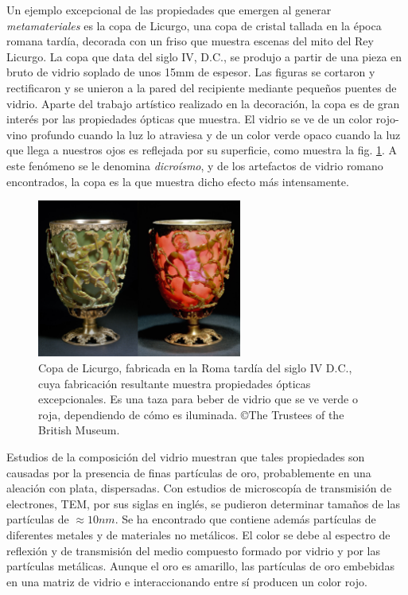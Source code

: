 \documentclass[12pt]{article}
\begin{document}
Un ejemplo excepcional de las propiedades que emergen al generar
\textit{metamateriales} es la copa de Licurgo, una copa de cristal
tallada en la época romana tardía, decorada con un friso que muestra
escenas del mito del Rey Licurgo. La copa que data del siglo IV, D.C.,
se produjo a partir de una pieza en bruto de vidrio soplado de unos
15mm de espesor. Las figuras se cortaron y rectificaron y se unieron a
la pared del recipiente mediante pequeños puentes de vidrio. Aparte
del trabajo artístico realizado en la decoración, la copa es de gran
interés por las propiedades ópticas que muestra. El vidrio se ve de
un color rojo-vino profundo cuando la luz lo atraviesa y de un color verde opaco
cuando la luz que llega a nuestros ojos es reflejada por su
superficie, como muestra la fig. \ref{Lycurgus}. A este fenómeno se le
denomina \textit{dicroísmo}, y de los artefactos de vidrio romano
encontrados, la copa es la que muestra dicho efecto más
intensamente. \cite{LycurgusInvestigation}
\begin{figure}
    \centering
    \includegraphics[width = 0.6\textwidth]{Lycurguscup.jpg}
    \caption{Copa de Licurgo, fabricada en la Roma tardía del siglo IV
      D.C., cuya fabricación resultante muestra propiedades ópticas
      excepcionales.  Es una taza para beber de vidrio que se ve verde
      o roja, dependiendo de cómo es iluminada.  ©The Trustees of the
      British Museum.}
    \label{Lycurgus}
\end{figure}
Estudios de la composición del vidrio muestran que tales propiedades
son causadas por la presencia de finas partículas de oro,
probablemente en una aleación con plata, dispersadas. Con estudios de
microscopía de transmisión de electrones, TEM, por sus siglas en
inglés, se pudieron determinar tamaños de las partículas de
$\approx 10 nm $.  Se ha encontrado que contiene además partículas de
diferentes metales y de materiales no metálicos. El color se debe al
espectro de reflexión y de transmisión del medio compuesto formado por
vidrio y por las partículas metálicas. Aunque el oro es amarillo, las
partículas de oro embebidas en una matriz de vidrio e interaccionando
entre sí producen un color rojo.
\end{document}
